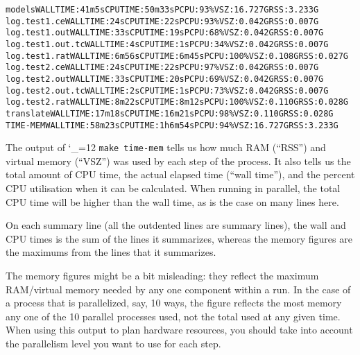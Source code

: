 \documentclass[11pt,letterpaper]{article}
\def\code{\begingroup\catcode`\_=12 \codex}
\newcommand{\codex}[1]{\texttt{#1}\endgroup}
\begin{document}
\begin{tiny}
\begin{alltt}
   models                                                 WALL TIME: 41m5s    CPU TIME: 50m33s    PCPU: 93\%    VSZ: 16.727G   RSS: 3.233G
      log.test1.ce                                        WALL TIME: 24s      CPU TIME: 22s       PCPU: 93\%    VSZ: 0.042G    RSS: 0.007G
      log.test1.out                                       WALL TIME: 33s      CPU TIME: 19s       PCPU: 68\%    VSZ: 0.042G    RSS: 0.007G
      log.test1.out.tc                                    WALL TIME: 4s       CPU TIME: 1s        PCPU: 34\%    VSZ: 0.042G    RSS: 0.007G
      log.test1.rat                                       WALL TIME: 6m56s    CPU TIME: 6m45s     PCPU: 100\%   VSZ: 0.108G    RSS: 0.027G
      log.test2.ce                                        WALL TIME: 24s      CPU TIME: 22s       PCPU: 97\%    VSZ: 0.042G    RSS: 0.007G
      log.test2.out                                       WALL TIME: 33s      CPU TIME: 20s       PCPU: 69\%    VSZ: 0.042G    RSS: 0.007G
      log.test2.out.tc                                    WALL TIME: 2s       CPU TIME: 1s        PCPU: 73\%    VSZ: 0.042G    RSS: 0.007G
      log.test2.rat                                       WALL TIME: 8m22s    CPU TIME: 8m12s     PCPU: 100\%   VSZ: 0.110G    RSS: 0.028G
   translate                                              WALL TIME: 17m18s   CPU TIME: 16m21s    PCPU: 98\%    VSZ: 0.110G    RSS: 0.028G
TIME-MEM                                                  WALL TIME: 58m23s   CPU TIME: 1h6m54s   PCPU: 94\%    VSZ: 16.727G   RSS: 3.233G
\end{alltt}
\end{tiny}

The output of \code{make time-mem} tells us how much RAM (``RSS'') and
virtual memory (``VSZ'') was used by each step of the process. It also tells us
the total amount of CPU time, the actual elapsed time (``wall time''), and the
percent CPU utilisation when it can be calculated.  When
running in parallel, the total CPU time will be higher than the wall time, as is
the case on many lines here.

On each summary line (all the outdented lines are summary lines),
the wall and CPU times is the sum of the
lines it summarizes, whereas the memory figures are the maximums from
the lines that it summarizes.

The memory figures might be a bit misleading: they reflect the maximum
RAM/virtual memory needed by any one component within a run.  In the case of a
process that is parallelized, say, 10 ways, the figure reflects the most memory
any one of the 10 parallel processes used, not the total used at any given
time.  When using this output to plan hardware resources, you should take into
account the parallelism level you want to use for each step.
\end{document}
